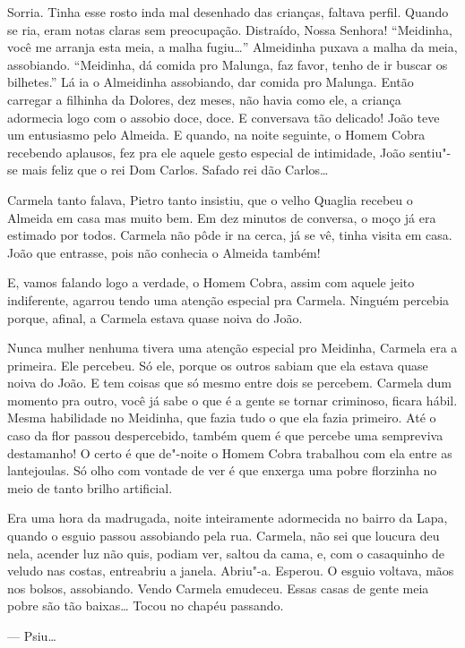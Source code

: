Sorria. Tinha esse rosto inda mal desenhado das crianças, faltava
perfil. Quando se ria, eram notas claras sem preocupação. Distraído,
Nossa Senhora! ``Meidinha, você me arranja esta meia, a malha fugiu\ldots{}''
Almeidinha puxava a malha da meia, assobiando. ``Meidinha, dá comida pro
Malunga, faz favor, tenho de ir buscar os bilhetes.'' Lá ia o Almeidinha
assobiando, dar comida pro Malunga. Então carregar a filhinha da
Dolores, dez meses, não havia como ele, a criança adormecia logo com o
assobio doce, doce. E conversava tão delicado! João teve um entusiasmo
pelo Almeida. E quando, na noite seguinte, o Homem Cobra recebendo
aplausos, fez pra ele aquele gesto especial de intimidade, João
sentiu"-se mais feliz que o rei Dom Carlos. Safado rei dão Carlos\ldots{}

Carmela tanto falava, Pietro tanto insistiu, que o velho Quaglia recebeu
o Almeida em casa mas muito bem. Em dez minutos de conversa, o moço já
era estimado por todos. Carmela não pôde ir na cerca, já se vê, tinha
visita em casa. João que entrasse, pois não conhecia o Almeida também!

E, vamos falando logo a verdade, o Homem Cobra, assim com aquele jeito
indiferente, agarrou tendo uma atenção especial pra Carmela. Ninguém
percebia porque, afinal, a Carmela estava quase noiva do João.

Nunca mulher nenhuma tivera uma atenção especial pro Meidinha, Carmela
era a primeira. Ele percebeu. Só ele, porque os outros sabiam que ela
estava quase noiva do João. E tem coisas que só mesmo entre dois se
percebem. Carmela dum momento pra outro, você já sabe o que é a gente se
tornar criminoso, ficara hábil. Mesma habilidade no Meidinha, que fazia
tudo o que ela fazia primeiro. Até o caso da flor passou despercebido,
também quem é que percebe uma sempreviva destamanho! O certo é que
de"-noite o Homem Cobra trabalhou com ela entre as lantejoulas. Só olho
com vontade de ver é que enxerga uma pobre florzinha no meio de tanto
brilho artificial.

Era uma hora da madrugada, noite inteiramente adormecida no bairro da
Lapa, quando o esguio passou assobiando pela rua. Carmela, não sei que
loucura deu nela, acender luz não quis, podiam ver, saltou da cama, e,
com o casaquinho de veludo nas costas, entreabriu a janela. Abriu"-a.
Esperou. O esguio voltava, mãos nos bolsos, assobiando. Vendo Carmela
emudeceu. Essas casas de gente meia pobre são tão baixas\ldots{} Tocou no
chapéu passando.

--- Psiu\ldots{}

